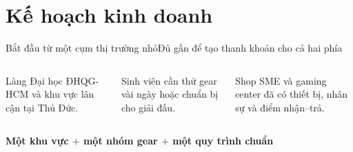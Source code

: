 \section{Kế hoạch kinh doanh}


\begin{frame}{Bắt đầu từ một cụm thị trường nhỏ}{Đủ gần để tạo thanh khoản cho cả hai phía}
  \vspace{.7em}
  \begin{columns}[T,onlytextwidth]
      \par\vspace{.45em}
      Làng Đại học ĐHQG-HCM và khu vực lân cận tại Thủ Đức.
      \par\vspace{.45em}
      Sinh viên cần thử gear vài ngày hoặc chuẩn bị cho giải đấu.
      \par\vspace{.45em}
      Shop SME và gaming center đã có thiết bị, nhân sự và điểm nhận--trả.
  \end{columns}
  \vfill
  \centering\Large\textcolor{mutuxBlue}{\textbf{Một khu vực $+$ một nhóm gear $+$ một quy trình chuẩn}}
\end{frame}


